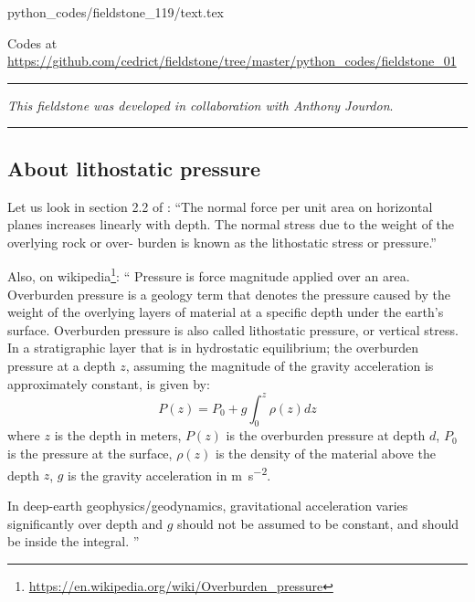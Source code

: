 \begin{flushright} {\tiny {\color{gray} python\_codes/fieldstone\_119/text.tex}} \end{flushright}



\begin{center}

Codes at \url{https://github.com/cedrict/fieldstone/tree/master/python_codes/fieldstone_01}
\end{center}

\par\noindent\rule{\textwidth}{0.4pt}

{\sl This fieldstone was developed in collaboration with Anthony Jourdon}. %

\par\noindent\rule{\textwidth}{0.4pt}

\subsection*{About lithostatic pressure}

Let us look in section 2.2 of \textcite{tusc}:
``The normal force per unit area on horizontal planes increases linearly with
depth. The normal stress due to the weight of the overlying rock or over-
burden is known as the lithostatic stress or pressure.''

Also, on wikipedia\footnote{\url{https://en.wikipedia.org/wiki/Overburden_pressure}}:
``
Pressure is force magnitude applied over an area. Overburden pressure is a geology term that denotes the pressure caused by 
the weight of the overlying layers of material at a specific depth under the earth's surface.
Overburden pressure is also called lithostatic pressure, or vertical stress.
In a stratigraphic layer that is in hydrostatic equilibrium; the overburden pressure at a depth $z$, assuming the magnitude 
of the gravity acceleration is approximately constant, is given by: 
\[
P(z)=P_0 + g \int_0^z \rho(z) dz
\]
where $z$ is the depth in meters, $P(z)$ is the overburden pressure at depth $d$,
$P_0$ is the pressure at the surface, $\rho(z)$ is the density of the material above the depth $z$,
$g$ is the gravity acceleration in \si{\meter\per\square\second}.

In deep-earth geophysics/geodynamics, gravitational acceleration varies significantly over depth and $g$
should not be assumed to be constant, and should be inside the integral. ''

